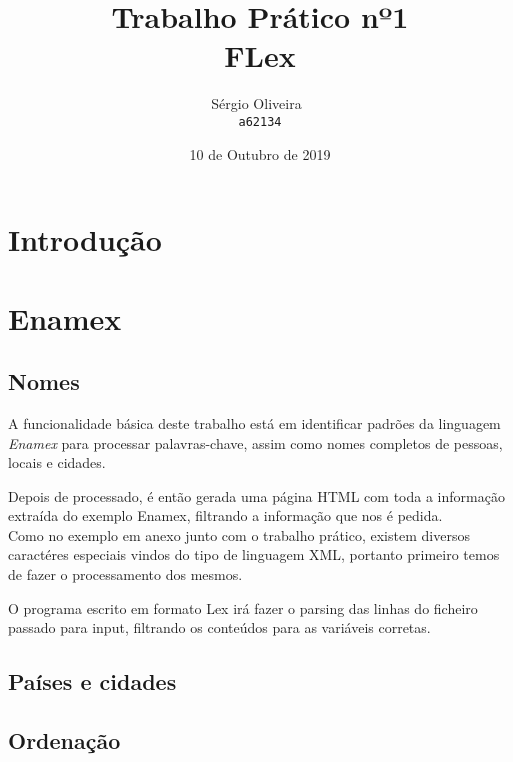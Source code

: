 \documentclass[11pt,a4paper]{report}
\begin{document}
\title{Trabalho Prático nº1 \\FLex}
\author{
   Sérgio Oliveira~\\
   \texttt{a62134}
   }
\date{10 de Outubro de 2019}
\maketitle
\raggedbottom
\pagebreak
\pagebreak


\tableofcontents
\pagebreak
\chapter{Introdução}

\raggedbottom
\pagebreak


\chapter{Enamex}
\section{Nomes}

A funcionalidade básica deste trabalho está em identificar padrões da linguagem \textit{Enamex} para processar palavras-chave, assim como nomes completos de pessoas, locais e cidades.

Depois de processado, é então gerada uma página HTML com toda a informação extraída do exemplo Enamex, filtrando a informação que nos é pedida.
~\\
Como no exemplo em anexo junto com o trabalho prático, existem diversos caractéres especiais vindos do tipo de linguagem XML, portanto primeiro temos de fazer o processamento dos mesmos.

O programa escrito em formato Lex irá fazer o parsing das linhas do ficheiro passado para input, filtrando os conteúdos para as variáveis corretas.

\pagebreak
\section{Países e cidades}
\pagebreak
\section{Ordenação}


\raggedbottom
\pagebreak
\end{document}
